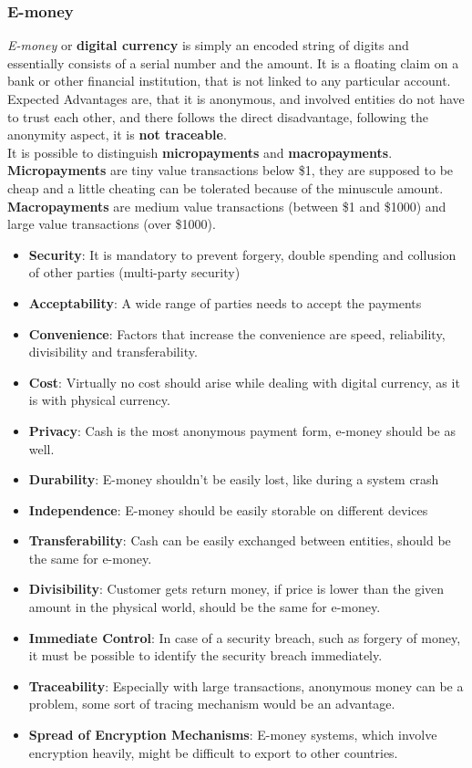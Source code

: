 \documentclass[a4paper, 10 pt, conference]{ieeeconf}
\begin{document}
\subsubsection{\textbf{E-money}}
\emph{E-money} or \textbf{digital currency} is simply an encoded string of digits and essentially consists of a serial number and the amount. 
It is a floating claim on a bank or other financial institution, that is not linked to any particular account. Expected Advantages are, that it is anonymous, and involved entities do not have to trust each other, and there follows the direct disadvantage, following the anonymity aspect, it is \textbf{not traceable}. \\
It is possible to distinguish \textbf{micropayments} and \textbf{macropayments}. \\
\textbf{Micropayments} are tiny value transactions below \$1, they are supposed to be cheap and a little cheating can be tolerated because of the minuscule amount. \\
\textbf{Macropayments} are medium value transactions (between \$1 and \$1000) and large value transactions (over \$1000). 
\label{tex:sect}
\begin{itemize}
\item \textbf{Security}: It is mandatory to prevent forgery, double spending and collusion of other parties (multi-party security)
\item \textbf{Acceptability}: A wide range of parties needs to accept the payments
\item \textbf{Convenience}: Factors that increase the convenience are speed, reliability, divisibility and transferability.
\item \textbf{Cost}: Virtually no cost should arise while dealing with digital currency, as it is with physical currency. 
\item \textbf{Privacy}: Cash is the most anonymous payment form, e-money should be as well. 
\item \textbf{Durability}: E-money shouldn't be easily lost, like during a system crash
\item \textbf{Independence}: E-money should be easily storable on different devices
\item \textbf{Transferability}: Cash can be easily exchanged between entities, should be the same for e-money.
\item \textbf{Divisibility}: Customer gets return money, if price is lower than the given amount in the physical world, should be the same for e-money.
\item \textbf{Immediate Control}: In case of a security breach, such as forgery of money, it must be possible to identify the security breach immediately. 
\item \textbf{Traceability}: Especially with large transactions, anonymous money can be a problem, some sort of tracing mechanism would be an advantage.
\item \textbf{Spread of Encryption Mechanisms}: E-money systems, which involve encryption heavily, might be difficult to export to other countries. 
\end{itemize}
\end{document}
